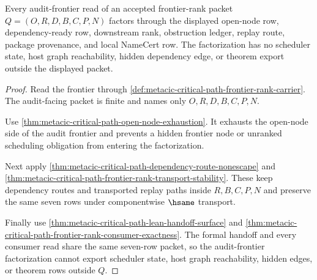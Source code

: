 \begin{theorem}
\label{thm:metacic-critical-path-audit-frontier-factorization}
Every audit-frontier read of an accepted frontier-rank packet $Q=(O,R,D,B,C,P,N)$ factors through the displayed open-node row, dependency-ready row, downstream rank, obstruction ledger, replay route, package provenance, and local NameCert row. The factorization has no scheduler state, host graph reachability, hidden dependency edge, or theorem export outside the displayed packet.
\end{theorem}
\begin{proof}
Read the frontier through \autoref{def:metacic-critical-path-frontier-rank-carrier}. The audit-facing packet is finite and names only $O,R,D,B,C,P,N$.

Use \autoref{thm:metacic-critical-path-open-node-exhaustion}. It exhausts the open-node side of the audit frontier and prevents a hidden frontier node or unranked scheduling obligation from entering the factorization.

Next apply \autoref{thm:metacic-critical-path-dependency-route-nonescape} and \autoref{thm:metacic-critical-path-frontier-rank-transport-stability}. These keep dependency routes and transported replay paths inside $R,B,C,P,N$ and preserve the same seven rows under componentwise $\hsame$ transport.

Finally use \autoref{thm:metacic-critical-path-lean-handoff-surface} and \autoref{thm:metacic-critical-path-frontier-rank-consumer-exactness}. The formal handoff and every consumer read share the same seven-row packet, so the audit-frontier factorization cannot export scheduler state, host graph reachability, hidden edges, or theorem rows outside $Q$.
\end{proof}

